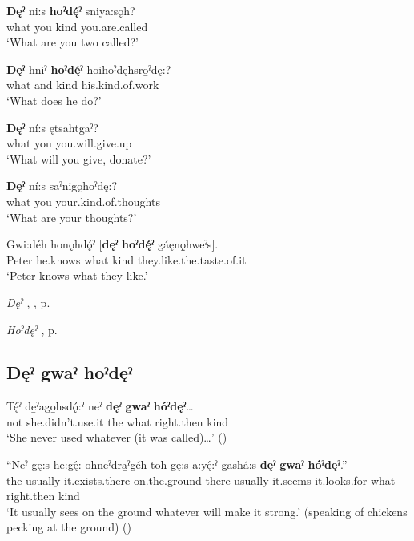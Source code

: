 \ea
\label{ex:dpart33}
\gll \textbf{Dęˀ} ni:s \textbf{hoˀdę́ˀ} sniya:sǫh? \\
what you kind you.are.called\\
\glt ‘What are you two called?’
\z

\ea
\label{ex:dpart34}
\gll \textbf{Dęˀ} hniˀ \textbf{hoˀdę́ˀ} hoihoˀdęhsro̱ˀdę:? \\
what and kind his.kind.of.work\\
\glt ‘What does he do?’
\z

\ea
\label{ex:dpart35}
\gll \textbf{Dęˀ} ní:s ętsahtgaˀ? \\
what you you.will.give.up \\
\glt ‘What will you give, donate?’
\z

\ea
\label{ex:dpart36}
\gll \textbf{Dęˀ} ní:s sa̱ˀnigǫ̱hoˀdę:? \\
what you your.kind.of.thoughts\\
\glt ‘What are your thoughts?’
\z

\ea
\label{ex:dpart37}
\gll Gwi:déh honǫhdǫ́ˀ [\textbf{dęˀ} \textbf{hoˀdę́ˀ} gáęnǫ̱hweˀs]. \\
Peter he.knows what kind they.like.the.taste.of.it \\
\glt ‘Peter knows what they like.’
\z

\begin{CayugaRelated}
\item \textit{Dęˀ} , , p. \pageref{p:[dęˀ-]}\\
\item \textit{Hoˀdęˀ} , p. \pageref{p:[hoˀdęˀ]}
\end{CayugaRelated}

\subsection*{\textbf{Dęˀ gwaˀ hoˀdęˀ} } \label{p:[dęˀ gwaˀ hoˀdęˀ]}

\ea
\label{ex:dpart10}
\gll Tę́ˀ de̱ˀago̱hsdǫ́:ˀ neˀ \textbf{dęˀ} \textbf{gwaˀ} \textbf{hóˀdęˀ}…\\
not she.didn’t.use.it the what right.then kind\\
`She never used whatever (it was called)…’ (\cite{henry_de_2005})
\z

\ea
\label{ex:dpart11}
\gll “Neˀ gę:s he:gę́: ohneˀdra̱ˀgéh toh gę:s a:yę́:ˀ gashá:s \textbf{dęˀ} \textbf{gwaˀ} \textbf{hóˀdęˀ}.”\\
the usually it.exists.there on.the.ground there usually it.seems it.looks.for what right.then kind\\
\glt ‘It usually sees on the ground whatever will make it strong.’ (speaking of chickens pecking at the ground) (\cite{henry_de_2005})
\z

